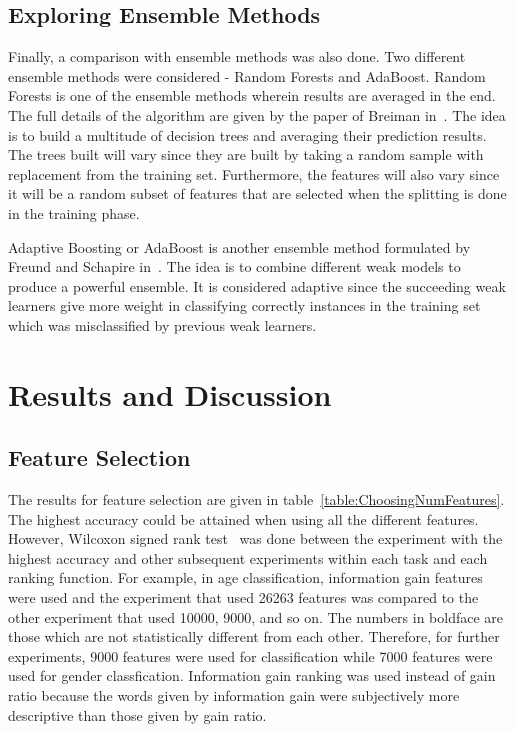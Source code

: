 \documentclass[a4paper]{llncs}
\begin{document}
\subsection{Exploring Ensemble Methods}
Finally, a comparison with ensemble methods was also done. Two different ensemble methods were considered - Random Forests and AdaBoost. Random Forests is one of the ensemble methods wherein results are averaged in the end. The full details of the algorithm are given by the paper of Breiman in~\cite{breiman2001random}. The idea is to build a multitude of decision trees and averaging their prediction results. The trees built will vary since they are built by taking a random sample with replacement from the training set. Furthermore, the features will also vary since it will be a random subset of features that are selected when the splitting is done in the training phase. 

Adaptive Boosting or AdaBoost is another ensemble method formulated by Freund and Schapire in~\cite{freund1997decision}. The idea is to combine different weak models to produce a powerful ensemble. It is considered adaptive since the succeeding weak learners give more weight in classifying correctly instances in the training set which was misclassified by previous weak learners. 


\section{Results and Discussion}	

\subsection{Feature Selection}
The results for feature selection are given in table~\ref{table:ChoosingNumFeatures}. The highest accuracy could be attained when using all the different features. However, Wilcoxon signed rank test~\cite{wilcoxon1945individual} was done between the experiment with the highest accuracy and other subsequent experiments within each task and each ranking function. For example, in age classification, information gain features were used and the experiment that used 26263 features was compared to the other experiment that used 10000, 9000, and so on. The numbers in boldface are those which are not statistically different from each other. Therefore, for further experiments, 9000 features were used for classification while 7000 features were used for gender classfication. Information gain ranking was used instead of gain ratio because the words given by information gain were subjectively more descriptive than those given by gain ratio. 
\end{document}
